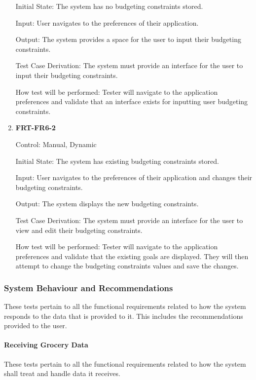 \documentclass[12pt, titlepage]{article}
\begin{document}
\begin{enumerate}
Initial State: The system has no budgeting constraints stored.

Input: User navigates to the preferences of their application.
          
Output: The system provides a space for the user to input their budgeting constraints.

Test Case Derivation: The system must provide an interface for the user to input their budgeting constraints.
          
How test will be performed: Tester will navigate to the application preferences and validate that an interface exists for inputting user budgeting constraints.

\item{\textbf{FRT-FR6-2}}

Control: Manual, Dynamic
          
Initial State: The system has existing budgeting constraints stored.

Input: User navigates to the preferences of their application and changes their budgeting constraints.
          
Output: The system displays the new budgeting constraints.

Test Case Derivation: The system must provide an interface for the user to view and edit their budgeting constraints.

How test will be performed: Tester will navigate to the application preferences and validate that the existing goals are displayed. They will then attempt to change the budgeting constraints values and save the changes.

\end{enumerate}

\subsubsection{System Behaviour and Recommendations}

These tests pertain to all the functional requirements related to how the system responds to the data that is provided to it. This includes the recommendations provided to the user.

\paragraph{Receiving Grocery Data}

These tests pertain to all the functional requirements related to how the system shall treat and handle data it receives.
\end{document}
